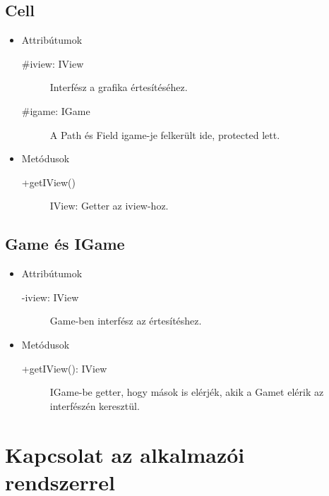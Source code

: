 \subsection{Cell}
\begin{itemize}
\item Attribútumok
	\begin{description}
		\item[\#iview: IView] Interfész a grafika értesítéséhez.
		\item[\#igame: IGame] A Path és Field igame-je felkerült ide, protected lett.
\end{description}
\item Metódusok
	\begin{description}
		\item[+getIView()] IView: Getter az iview-hoz.
	\end{description}
\end{itemize}

\subsection{Game és IGame}
\begin{itemize}
\item Attribútumok\\
	\begin{description}
		\item[-iview: IView] Game-ben interfész az értesítéshez.
\end{description}
\item Metódusok
	\begin{description}
		\item[+getIView(): IView] IGame-be getter, hogy mások is elérjék, akik a Gamet elérik az interfészén keresztül.
	\end{description}
\end{itemize}



\section{Kapcsolat az alkalmazói rendszerrel}
